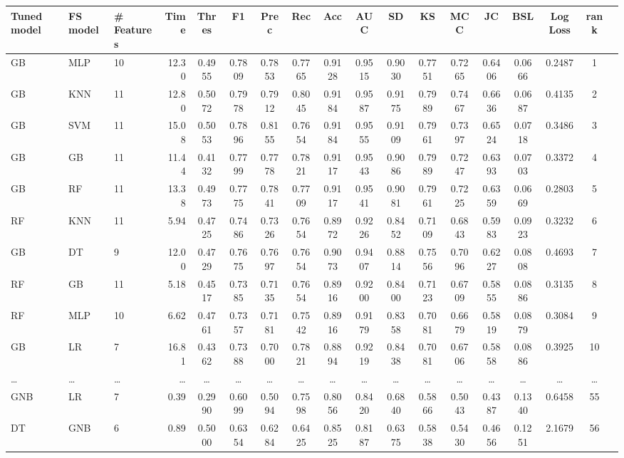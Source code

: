 \begin{table}[H]
{\begin{tabular}{|p{1.3cm}|p{1.2cm}|p{1.4cm}|r|c|c|c|c|c|c|c|c|c|c|c|c|c|c|}
    \toprule
    \textbf{Tuned model} & \textbf{FS model} & \# \newline Features & Time & Thres & F1 & Prec & Rec & Acc & AUC & SD & KS & MCC & JC & BSL & Log Loss & rank \\
    \midrule
    \hline
    GB & MLP & 10 & 12.30 & 0.4955 & 0.7809 & 0.7853 & 0.7765 & 0.9128 & 0.9515 & 0.9030 & 0.7751 & 0.7265 & 0.6406 & 0.0666 & 0.2487 & 1 \\
GB & KNN & 11 & 12.80 & 0.5072 & 0.7978 & 0.7912 & 0.8045 & 0.9184 & 0.9587 & 0.9175 & 0.7989 & 0.7467 & 0.6636 & 0.0687  & 0.4135 & 2 \\
GB & SVM & 11 & 15.08 & 0.5053 & 0.7896 & 0.8155 & 0.7654 & 0.9184 & 0.9555 & 0.9109 & 0.7961 & 0.7397 & 0.6524 & 0.0718  & 0.3486 & 3 \\
GB & GB & 11 & 11.44 & 0.4132 & 0.7799 & 0.7778 & 0.7821 & 0.9117 & 0.9543 & 0.9086 & 0.7989 & 0.7247 & 0.6393 & 0.0703  & 0.3372 & 4 \\
GB & RF & 11 & 13.38 & 0.4973 & 0.7775 & 0.7841 & 0.7709 & 0.9117 & 0.9541 & 0.9081 & 0.7961 & 0.7225 & 0.6359 & 0.0669 & 0.2803 & 5 \\
RF & KNN & 11 & 5.94 & 0.4725 & 0.7486 & 0.7326 & 0.7654 & 0.8972 & 0.9226 & 0.8452 & 0.7109 & 0.6843 & 0.5983 & 0.0923 & 0.3232 & 6 \\
GB & DT & 9 & 12.00 & 0.4729 & 0.7675 & 0.7697 & 0.7654 & 0.9073 & 0.9407 & 0.8814 & 0.7556 & 0.7096 & 0.6227 &0.0808 &  0.4693 & 7 \\
RF & GB & 11 & 5.18 & 0.4517 & 0.7385 & 0.7135 & 0.7654 & 0.8916 & 0.9200 & 0.8400 & 0.7123 & 0.6709 & 0.5855 & 0.0886  & 0.3135 & 8 \\
RF & MLP & 10 & 6.62 & 0.4761 & 0.7357 & 0.7181 & 0.7542 & 0.8916 & 0.9179 & 0.8358 & 0.7081 & 0.6679 & 0.5819 & 0.0879  & 0.3084 & 9 \\
GB & LR & 7 & 16.81 & 0.4362 & 0.7388 & 0.7000 & 0.7821 & 0.8894 & 0.9219 & 0.8438 & 0.7081 & 0.6706 & 0.5858 & 0.0886 & 0.3925 & 10 \\
\ldots & \ldots & \ldots & \ldots & \ldots & \ldots & \ldots & \ldots & \ldots & \ldots & \ldots & \ldots & \ldots & \ldots & \ldots & \ldots & \ldots \\
GNB & LR & 7 & 0.39 & 0.2990 & 0.6099 & 0.5094 & 0.7598 & 0.8056 & 0.8420 & 0.6840 & 0.5866 & 0.5043 & 0.4387 & 0.1340 & 0.6458
& 55 \\
DT & GNB & 6 & 0.89 & 0.5000 & 0.6354 & 0.6284 & 0.6425 & 0.8525 & 0.8187 & 0.6375 & 0.5838 & 0.5430 & 0.4656 & 0.1251 &  2.1679 & 56 \\

\end{tabular}}
\end{table}
